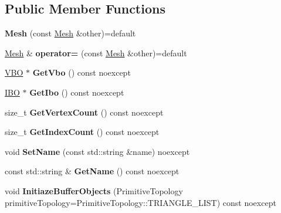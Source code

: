 \subsection*{Public Member Functions}
\begin{DoxyCompactItemize}
\item 
\mbox{\label{class_blade_1_1_mesh_a12f89e6501212e312b12babb4fd59758}} 
{\bfseries Mesh} (const \hyperlink{class_blade_1_1_mesh}{Mesh} \&other)=default
\item 
\mbox{\label{class_blade_1_1_mesh_a66fc167597509ce88c82cc874b74eba2}} 
\hyperlink{class_blade_1_1_mesh}{Mesh} \& {\bfseries operator=} (const \hyperlink{class_blade_1_1_mesh}{Mesh} \&other)=default
\item 
\mbox{\label{class_blade_1_1_mesh_ac744768bab4751218d8d045a789cd500}} 
\hyperlink{class_blade_1_1_v_b_o}{V\+BO} $\ast$ {\bfseries Get\+Vbo} () const noexcept
\item 
\mbox{\label{class_blade_1_1_mesh_a0947f99719a0012972a4fd547c71b217}} 
\hyperlink{class_blade_1_1_i_b_o}{I\+BO} $\ast$ {\bfseries Get\+Ibo} () const noexcept
\item 
\mbox{\label{class_blade_1_1_mesh_ae0ba2d92ddf8353d71378206d153cbbf}} 
size\+\_\+t {\bfseries Get\+Vertex\+Count} () const noexcept
\item 
\mbox{\label{class_blade_1_1_mesh_a91e234f58ba1354f0a5d4532cd3162f4}} 
size\+\_\+t {\bfseries Get\+Index\+Count} () const noexcept
\item 
\mbox{\label{class_blade_1_1_mesh_af242f6990adeae394d3049efb38e4e5b}} 
void {\bfseries Set\+Name} (const std\+::string \&name) noexcept
\item 
\mbox{\label{class_blade_1_1_mesh_ad4974970aa0137d481e4233819286bcd}} 
const std\+::string \& {\bfseries Get\+Name} () const noexcept
\item 
\mbox{\label{class_blade_1_1_mesh_a39f1b844c2f3b7f804e42241251ee293}} 
void {\bfseries Initiaze\+Buffer\+Objects} (Primitive\+Topology primitive\+Topology=Primitive\+Topology\+::\+T\+R\+I\+A\+N\+G\+L\+E\+\_\+\+L\+I\+ST) const noexcept

\end{DoxyCompactItemize}
